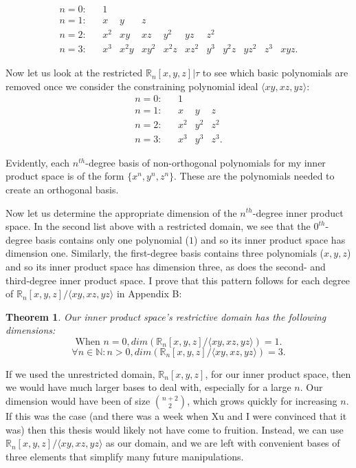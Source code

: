 \documentclass[letterpaper, 12pt]{article}
\newtheorem{thm}{Theorem}[section]
\begin{document}
\newpage
\vspace*{-16mm}
$$\begin{array}{llllllllllll}
	n=0: && 1 \\
	n=1: && x & y & z \\
	n=2: && x^2 & xy & xz & y^2 & yz & z^2 \\
	n=3: && x^3 & x^2y & xy^2 & x^2z & xz^2 & y^3 & y^2z & yz^2 & z^3 & xyz.
\end{array}$$

\vspace{3mm}
\noindent Now let us look at the restricted $\mathbb{R}_n [x, y, z] | \tau$  to see which basic polynomials are removed once we consider the constraining polynomial ideal $\langle xy, xz, yz\rangle$:
$$\begin{array}{lllll}
	n=0: && 1 \\
	n=1: && x & y & z \\
	n=2: && x^2 & y^2 & z^2 \\
	n=3: && x^3 & y^3 & z^3.
\end{array}$$

\noindent Evidently, each $n^{th}$-degree basis of non-orthogonal polynomials for my inner product space is of the form $\{x^n, y^n, z^n\}$. These are the polynomials needed to create an orthogonal basis. 

Now let us determine the appropriate dimension of the $n^{th}$-degree inner product space. In the second list above with a restricted domain, we see that the $0^{th}$-degree basis contains only one polynomial ($1$) and so its inner product space has dimension one. Similarly, the first-degree basis contains three polynomials ($x, y, z$) and so its inner product space has dimension three, as does the second- and third-degree inner product space. I prove that this pattern follows for each degree of $\mathbb{R}_n [x, y, z] / \langle xy, xz, yz\rangle$ in Appendix B:

\begin{thm} Our inner product space's restrictive domain has the following dimensions:
	\vspace{-4mm}
	$$\text{When }n=0, dim(\mathbb{R}_n [x, y, z] / \langle xy, xz, yz\rangle) = 1.$$
	$$\forall n\in \mathbb{N} : n > 0, dim(\mathbb{R}_n [x, y, z] / \langle xy, xz, yz\rangle) = 3.$$
\end{thm}

If we used the unrestricted domain, $\mathbb{R}_n [x, y, z]$, for our inner product space, then we would have much larger bases to deal with, especially for a large $n$. Our dimension would have been of size $\binom{n+2}{2}$, which grows quickly for increasing $n$. If this was the case (and there was a week when Xu and I were convinced that it was) then this thesis would likely not have come to fruition. Instead, we can use $\mathbb{R}_n [x, y, z] / \langle xy, xz, yz\rangle$ as our domain, and we are left with convenient bases of three elements that simplify many future manipulations.
\end{document}
